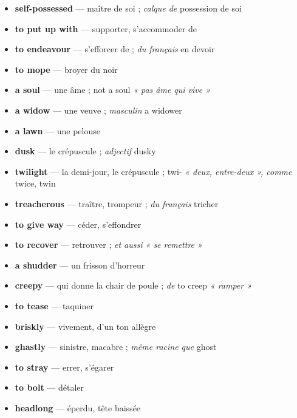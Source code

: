 \documentclass{fiche}
\begin{document}



\begin{itemize}[label=--,itemsep=0.8mm,leftmargin=*]\small
  \item \textbf{self-possessed} — maître de soi ; \textit{calque de} possession de soi
  \item \textbf{to put up with} — supporter, s'accommoder de
  \item \textbf{to endeavour} — s'efforcer de ; \textit{du français} en devoir
  \item \textbf{to mope} — broyer du noir
  \item \textbf{a soul} — une âme ; not a soul \textit{« pas âme qui vive »}
  \item \textbf{a widow} — une veuve ; \textit{masculin} a widower
  \item \textbf{a lawn} — une pelouse
  \item \textbf{dusk} — le crépuscule ; \textit{adjectif} dusky
  \item \textbf{twilight} — la demi-jour, le crépuscule ; twi- \textit{« deux, entre-deux », comme} twice, twin
  \item \textbf{treacherous} — traître, trompeur ; \textit{du français} tricher
  \item \textbf{to give way} — céder, s'effondrer
  \item \textbf{to recover} — retrouver ; \textit{et aussi « se remettre »}
  \item \textbf{a shudder} — un frisson d'horreur
  \item \textbf{creepy} — qui donne la chair de poule ; \textit{de} to creep \textit{« ramper »}
  \item \textbf{to tease} — taquiner
  \item \textbf{briskly} — vivement, d'un ton allègre
  \item \textbf{ghastly} — sinistre, macabre ; \textit{même racine que} ghost
  \item \textbf{to stray} — errer, s'égarer
  \item \textbf{to bolt} — détaler
  \item \textbf{headlong} — éperdu, tête baissée
\end{itemize}
\end{document}
